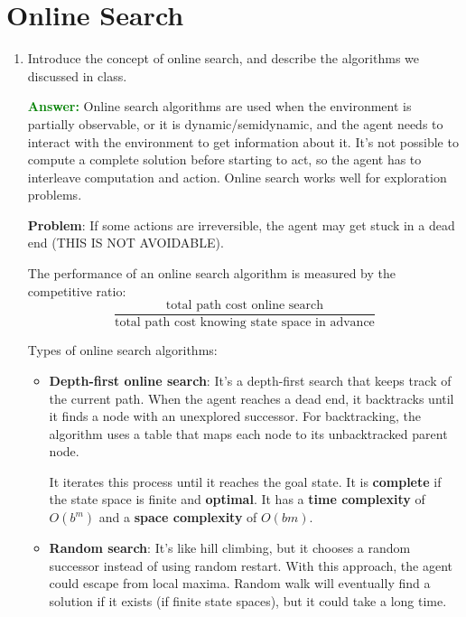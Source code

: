 \documentclass[12pt]{article}
\begin{document}
\section{Online Search}\label{onlinesearch}
\begin{enumerate}[label=\textbf{OS.\arabic*}]
    \item Introduce the concept of online search, and describe the algorithms we discussed in class.

          \textcolor{green}{\textbf{Answer:}}
          Online search algorithms are used when the environment is partially observable, or it is dynamic/semidynamic,
          and the agent needs to interact with the environment to get information about it.
          It's not possible to compute a complete solution before starting to act, so the agent has to interleave computation and action.
          Online search works well for exploration problems.

          \textbf{Problem}: If some actions are irreversible, the agent may get stuck in a dead end (THIS IS NOT AVOIDABLE).

          The performance of an online search algorithm is measured by the competitive ratio:
          \begin{equation}
              \frac{\text{total path cost online search}}{\text{total path cost knowing state space in advance}}
              \label{eq:competitive-ratio}
          \end{equation}

          Types of online search algorithms:
          \begin{itemize}
              \item \textbf{Depth-first online search}: It's a depth-first search that keeps track of the current path.
                    When the agent reaches a dead end, it backtracks until it finds a node with an unexplored successor.
                    For backtracking, the algorithm uses a table that maps each node to its unbacktracked parent node.

                    It iterates this process until it reaches the goal state.
                    It is \textbf{complete} if the state space is finite and \textbf{optimal}.
                    It has a \textbf{time complexity} of $O(b^m)$ and a \textbf{space complexity} of $O(bm)$.

              \item \textbf{Random search}: It's like hill climbing, but it chooses a random successor instead of using random restart.
                    With this approach, the agent could escape from local maxima.
                    Random walk will eventually find a solution if it exists (if finite state spaces), but it could take a long time.


\end{itemize}
\end{enumerate}
\end{document}
